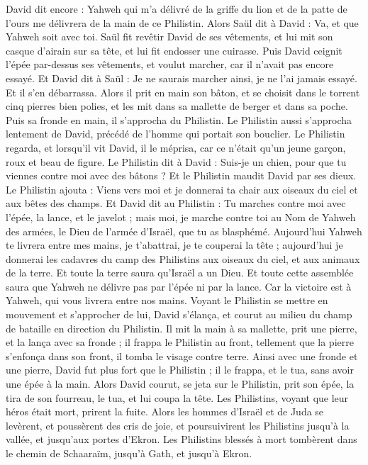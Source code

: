 \begin{multicols}{2}
David dit encore : Yahweh qui m'a délivré de la griffe du lion et de la patte de l'ours me délivrera de la main de ce Philistin. Alors Saül dit à David : Va, et que Yahweh soit avec toi.
Saül fit revêtir David de ses vêtements, et lui mit son casque d'airain sur sa tête, et lui fit endosser une cuirasse.
Puis David ceignit l'épée par-dessus ses vêtements, et voulut marcher, car il n’avait pas encore essayé. Et David dit à Saül : Je ne saurais marcher ainsi, je ne l’ai jamais essayé. Et il s’en débarrassa.
Alors il prit en main son bâton, et se choisit dans le torrent cinq pierres bien polies, et les mit dans sa mallette de berger et dans sa poche. Puis sa fronde en main, il s'approcha du Philistin.
Le Philistin aussi s'approcha lentement de David, précédé de l'homme qui portait son bouclier.
Le Philistin regarda, et lorsqu’il vit David, il le méprisa, car ce n'était qu'un jeune garçon, roux et beau de figure.
Le Philistin dit à David : Suis-je un chien, pour que tu viennes contre moi avec des bâtons ? Et le Philistin maudit David par ses dieux.
Le Philistin ajouta : Viens vers moi et je donnerai ta chair aux oiseaux du ciel et aux bêtes des champs.
Et David dit au Philistin : Tu marches contre moi avec l'épée, la lance, et le javelot ; mais moi, je marche contre toi au Nom de Yahweh des armées, le Dieu de l’armée d'Israël, que tu as blasphémé.
Aujourd'hui Yahweh te livrera entre mes mains, je t’abattrai, je te couperai la tête ; aujourd'hui je donnerai les cadavres du camp des Philistins aux oiseaux du ciel, et aux animaux de la terre. Et toute la terre saura qu'Israël a un Dieu.
Et toute cette assemblée saura que Yahweh ne délivre pas par l'épée ni par la lance. Car la victoire est à Yahweh, qui vous livrera entre nos mains.
Voyant le Philistin se mettre en mouvement et s'approcher de lui, David s’élança, et courut au milieu du champ de bataille en direction du Philistin.
Il mit la main à sa mallette, prit une pierre, et la lança avec sa fronde ; il frappa le Philistin au front, tellement que la pierre s'enfonça dans son front, il tomba le visage contre terre.
Ainsi avec une fronde et une pierre, David fut plus fort que le Philistin ; il le frappa, et le tua, sans avoir une épée à la main.
Alors David courut, se jeta sur le Philistin, prit son épée, la tira de son fourreau, le tua, et lui coupa la tête. Les Philistins, voyant que leur héros était mort, prirent la fuite.
Alors les hommes d'Israël et de Juda se levèrent, et poussèrent des cris de joie, et poursuivirent les Philistins jusqu'à la vallée, et jusqu'aux portes d’Ekron. Les Philistins blessés à mort tombèrent dans le chemin de Schaaraïm, jusqu'à Gath, et jusqu'à Ekron.

\end{multicols}
